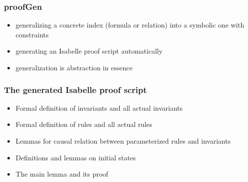 \documentclass{beamer}
\begin{document}
\begin{frame}\frametitle{ {\sf proofGen}}


\begin{itemize}
\item  generalizing a concrete index (formula or relation) into
a symbolic one with constraints

\item generating an Isabelle proof script automatically


\item generalization is abstraction in essence
\end{itemize}
 \end{frame}

\begin{frame}\frametitle{ {\sf The generated Isabelle proof script}}


\begin{itemize}
\item Formal definition of   invariants and all actual invariants

\item Formal definition of   rules and all actual rules


\item Lemmas for causal relation between parameterized rules and invariants

\item Definitions and lemmas on initial states

\item The main lemma and its proof

\end{itemize}
 \end{frame}
\end{document}
